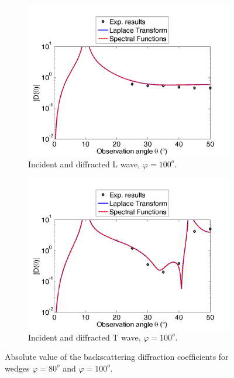 \begin{figure}[h!]
     \begin{subfigure}[b]{0.45\textwidth}
        \includegraphics[width=\textwidth]{images/chapter3/Retrodiff_D_100_LL.png}
        \caption{Incident and diffracted L wave, $\varphi=100^o$.}
        \label{C3:DLL100}
    \end{subfigure}
    \hfill
    \begin{subfigure}[b]{0.45\textwidth}
        \includegraphics[width=\textwidth]{images/chapter3/Retrodiff_D_100_TT.png}
        \caption{Incident and diffracted T wave, $\varphi=100^o$.}
        \label{C3:DTT100}
     \end{subfigure}
     \caption{Absolute value of the backscattering diffraction coefficients for wedges $\varphi=80^o$ and $\varphi=100^o$.}
     \label{C3:expcoeffs}
\end{figure}

